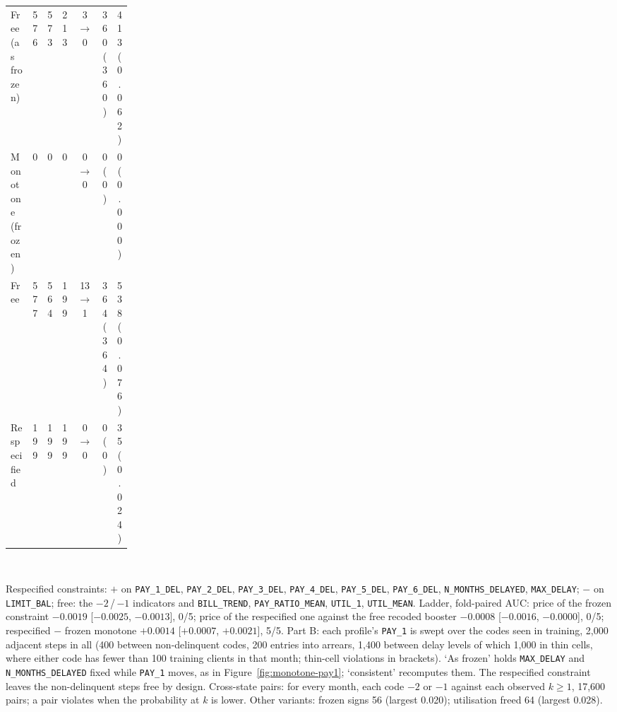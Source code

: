 \begin{table}[!htbp]
\begin{tabular}{@{}L{0.20\linewidth}cccccc@{}}
    \midrule
    Free (as frozen) & 576 & 573 & 213 & 3 $\to$ 0 & 360 (360) & 413 (0.062) \\
    Monotone (frozen) & 0 & 0 & 0 & 0 $\to$ 0 & 0 (0) & 0 (0.000) \\
    Free & 577 & 564 & 199 & 13 $\to$ 1 & 364 (364) & 538 (0.076) \\
    Respecified & 199 & 199 & 199 & 0 $\to$ 0 & 0 (0) & 35 (0.024) \\
    \bottomrule
  \end{tabular}
  \\[3pt]\begin{minipage}{\linewidth}\footnotesize Respecified constraints: $+$ on \texttt{PAY\_\allowbreak{}1\_\allowbreak{}DEL}, \texttt{PAY\_\allowbreak{}2\_\allowbreak{}DEL}, \texttt{PAY\_\allowbreak{}3\_\allowbreak{}DEL}, \texttt{PAY\_\allowbreak{}4\_\allowbreak{}DEL}, \texttt{PAY\_\allowbreak{}5\_\allowbreak{}DEL}, \texttt{PAY\_\allowbreak{}6\_\allowbreak{}DEL}, \texttt{N\_\allowbreak{}MONTHS\_\allowbreak{}DELAYED}, \texttt{MAX\_\allowbreak{}DELAY}; $-$ on \texttt{LIMIT\_\allowbreak{}BAL}; free: the $-2$\,/\,$-1$ indicators and \texttt{BILL\_\allowbreak{}TREND}, \texttt{PAY\_\allowbreak{}RATIO\_\allowbreak{}MEAN}, \texttt{UTIL\_\allowbreak{}1}, \texttt{UTIL\_\allowbreak{}MEAN}. Ladder, fold-paired AUC: price of the frozen constraint $-0.0019$ [$-0.0025$, $-0.0013$], 0/5; price of the respecified one against the free recoded booster $-0.0008$ [$-0.0016$, $-0.0000$], 0/5; respecified $-$ frozen monotone $+0.0014$ [$+0.0007$, $+0.0021$], 5/5. Part B: each profile's \texttt{PAY\_1} is swept over the codes seen in training, 2,000 adjacent steps in all (400 between non-delinquent codes, 200 entries into arrears, 1,400 between delay levels of which 1,000 in thin cells, where either code has fewer than 100 training clients in that month; thin-cell violations in brackets). `As frozen' holds \texttt{MAX\_DELAY} and \texttt{N\_MONTHS\_DELAYED} fixed while \texttt{PAY\_1} moves, as in Figure~\ref{fig:monotone-pay1}; `consistent' recomputes them. The respecified constraint leaves the non-delinquent steps free by design. Cross-state pairs: for every month, each code $-2$ or $-1$ against each observed $k \ge 1$, 17,600 pairs; a pair violates when the probability at $k$ is lower. Other variants: frozen signs 56 (largest 0.020); utilisation freed 64 (largest 0.028).\end{minipage}
\end{table}

